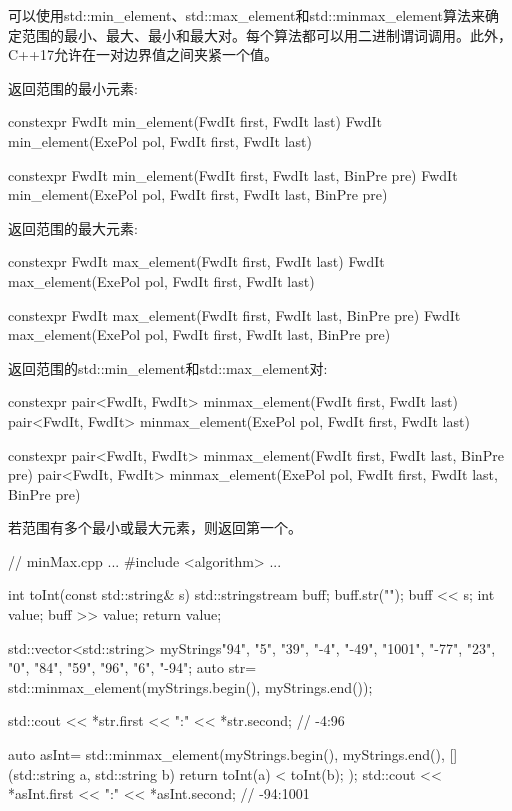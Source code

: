 可以使用std::min\_element、std::max\_element和std::minmax\_element算法来确定范围的最小、最大、最小和最大对。每个算法都可以用二进制谓词调用。此外，C++17允许在一对边界值之间夹紧一个值。

返回范围的最小元素:

\begin{cpp}
constexpr FwdIt min_element(FwdIt first, FwdIt last)
FwdIt min_element(ExePol pol, FwdIt first, FwdIt last)

constexpr FwdIt min_element(FwdIt first, FwdIt last, BinPre pre)
FwdIt min_element(ExePol pol, FwdIt first, FwdIt last, BinPre pre)
\end{cpp}

返回范围的最大元素:

\begin{cpp}
constexpr FwdIt max_element(FwdIt first, FwdIt last)
FwdIt max_element(ExePol pol, FwdIt first, FwdIt last)

constexpr FwdIt max_element(FwdIt first, FwdIt last, BinPre pre)
FwdIt max_element(ExePol pol, FwdIt first, FwdIt last, BinPre pre)
\end{cpp}

返回范围的std::min\_element和std::max\_element对:

\begin{cpp}
constexpr pair<FwdIt, FwdIt> minmax_element(FwdIt first, FwdIt last)
pair<FwdIt, FwdIt> minmax_element(ExePol pol, FwdIt first, FwdIt last)

constexpr pair<FwdIt, FwdIt> minmax_element(FwdIt first, FwdIt last, BinPre pre)
pair<FwdIt, FwdIt> minmax_element(ExePol pol, FwdIt first, FwdIt last,
								  BinPre pre)
\end{cpp}

若范围有多个最小或最大元素，则返回第一个。


\begin{cpp}
// minMax.cpp
...
#include <algorithm>
...

int toInt(const std::string& s){
	std::stringstream buff;
	buff.str("");
	buff << s;
	int value;
	buff >> value;
	return value;
}

std::vector<std::string> myStrings{"94", "5", "39", "-4", "-49", "1001", "-77",
							       "23", "0", "84", "59", "96", "6", "-94"};
auto str= std::minmax_element(myStrings.begin(), myStrings.end());

std::cout << *str.first << ":" << *str.second; // -4:96

auto asInt= std::minmax_element(myStrings.begin(), myStrings.end(),
			[](std::string a, std::string b){ return toInt(a) < toInt(b); });
std::cout << *asInt.first << ":" << *asInt.second; // -94:1001
\end{cpp}

